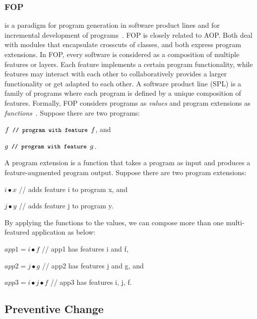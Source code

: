 \documentclass[runningheads,a4paper]{llncs}
\newcommand{\text}[1]{\footnotesize{\texttt{#1}}\normalsize}
\begin{document}
\subsubsection{FOP} is a paradigm for program generation in software product lines and for incremental development of programs~\cite{Batory1992:DIH}. 
FOP is closely related to AOP. Both deal with modules that encapsulate crosscuts of classes, and both express program extensions.
In FOP, every software is considered as a composition of multiple features or layers. Each feature implements a certain program functionality, while features may interact with each other to collaboratively provides a larger functionality or get adapted to each other.
A software product line (SPL) is a family of programs where each program is defined by a unique composition of features. Formally, FOP considers programs as \emph{values} and program extensions as \emph{functions}~\cite{Lammel2013:fop}. Suppose there are two programs: 

$f \text{	// program with feature }f$, and

$g\text{	// program with feature }g$.

\noindent
A program extension is a function that takes a program as input and produces a feature-augmented program output. Suppose there are two program extensions:

$i \bullet x$ // adds feature i to program x, and 

$j \bullet y$ // adds feature j to program y.

By applying the functions to the values, we can compose more than one multi-featured application as below:

$app1 = i \bullet f$ // app1 has features i and f,

$app2 = j \bullet g$ // app2 has features j and g, and
 
$app3 = i \bullet j \bullet f$ // app3 has features i, j, f.

\subsection{Preventive Change}
\end{document}
